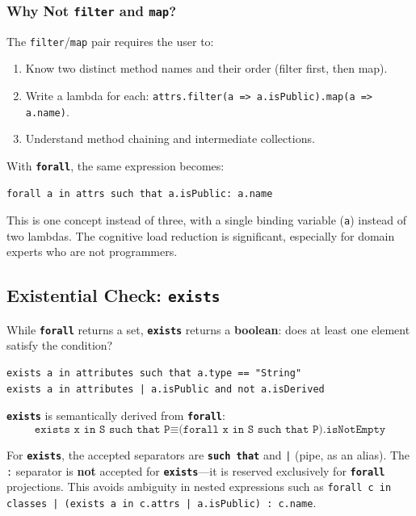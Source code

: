 \documentclass[11pt,a4paper]{article}
\newcommand{\kw}[1]{\texttt{\textbf{#1}}}
\begin{document}
\subsubsection{Why Not \texttt{filter} and \texttt{map}?}

The \texttt{filter}/\texttt{map} pair requires the user to:
\begin{enumerate}
    \item Know two distinct method names and their order (filter first, then map).
    \item Write a lambda for each: \texttt{attrs.filter(a => a.isPublic).map(a => a.name)}.
    \item Understand method chaining and intermediate collections.
\end{enumerate}

With \kw{forall}, the same expression becomes:
\begin{lstlisting}[style=jjel,numbers=none]
forall a in attrs such that a.isPublic: a.name
\end{lstlisting}

This is one concept instead of three, with a single binding variable (\texttt{a}) instead of two lambdas. The cognitive load reduction is significant, especially for domain experts who are not programmers.


\subsection{Existential Check: \texttt{exists}}\label{sec:exists}

While \kw{forall} returns a set, \kw{exists} returns a \textbf{boolean}: does at least one element satisfy the condition?

\begin{lstlisting}[style=jjel,numbers=none]
exists a in attributes such that a.type == "String"
exists a in attributes | a.isPublic and not a.isDerived
\end{lstlisting}

\kw{exists} is semantically derived from \kw{forall}:
\[
\texttt{exists x in S such that P} \equiv \texttt{(forall x in S such that P).isNotEmpty}
\]

For \kw{exists}, the accepted separators are \kw{such that} and \texttt{|} (pipe, as an alias). The \texttt{:} separator is \textbf{not} accepted for \kw{exists}---it is reserved exclusively for \kw{forall} projections. This avoids ambiguity in nested expressions such as \texttt{forall c in classes | (exists a in c.attrs | a.isPublic) : c.name}.
\end{document}
